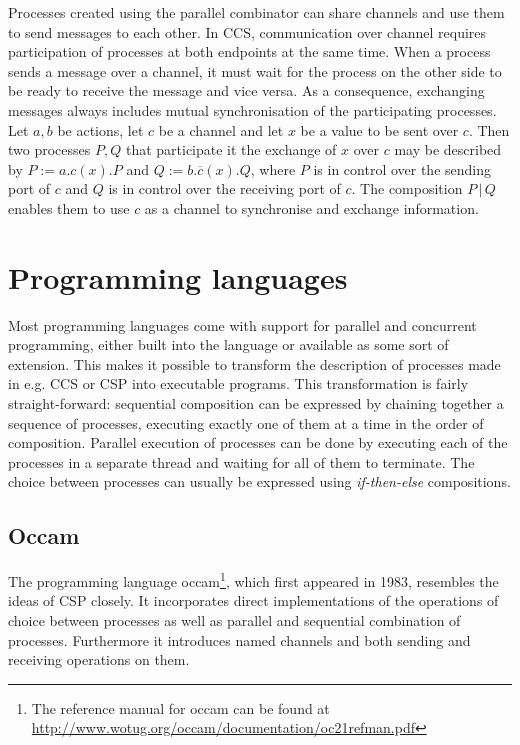 Processes created using the parallel combinator can share channels and use them to send messages to each other. In \textsc{CCS}, communication over channel requires participation of processes at both endpoints at the same time. When a process sends a message over a channel, it must wait for the process on the other side to be ready to receive the message and vice versa. As a consequence, exchanging messages always includes mutual synchronisation of the participating processes. Let $a, b$ be actions, let $c$ be a channel and let $x$ be a value to be sent over $c$. Then two processes $P, Q$ that participate it the exchange of $x$ over $c$ may be described by $P := a.c\left(x\right).P$ and $Q := b.\overline{c}\left(x\right).Q$, where $P$ is in control over the sending port of $c$ and $Q$ is in control over the receiving port of $c$. The composition $P \,|\, Q$ enables them to use $c$ as a channel to synchronise and exchange information.


\section{Programming languages}
Most programming languages come with support for parallel and concurrent programming, either built into the language or available as some sort of extension. This makes it possible to transform the description of processes made in e.g. \textsc{CCS} or \textsc{CSP} into executable programs. This transformation is fairly straight-forward: sequential composition can be expressed by chaining together a sequence of processes, executing exactly one of them at a time in the order of composition. Parallel execution of processes can be done by executing each of the processes in a separate thread and waiting for all of them to terminate. The choice between processes can usually be expressed using \textit{if-then-else} compositions.

\clearpage
\subsection{Occam}
The programming language \textsf{occam}\footnote{The reference manual for \textsf{occam} can be found at \url{http://www.wotug.org/occam/documentation/oc21refman.pdf}}, which first appeared in 1983, resembles the ideas of CSP closely. It incorporates direct implementations of the operations of choice between processes as well as parallel and sequential combination of processes. Furthermore it introduces named channels and both sending and receiving operations on them.

